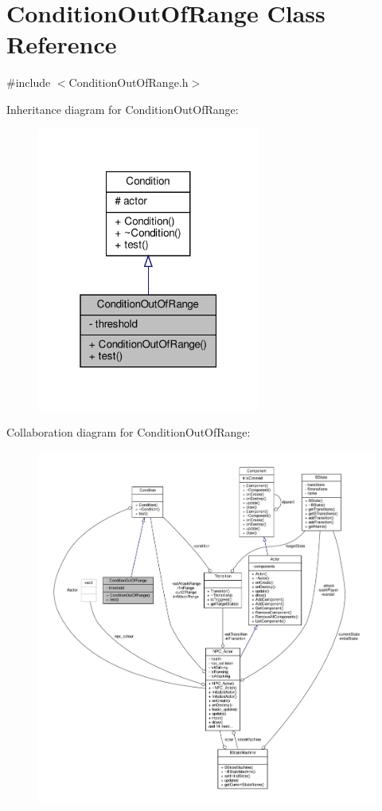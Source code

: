 \hypertarget{classConditionOutOfRange}{}\section{Condition\+Out\+Of\+Range Class Reference}
\label{classConditionOutOfRange}


{\ttfamily \#include $<$Condition\+Out\+Of\+Range.\+h$>$}



Inheritance diagram for Condition\+Out\+Of\+Range\+:
\nopagebreak
\begin{figure}[H]
\begin{center}
\leavevmode
\includegraphics[width=208pt]{classConditionOutOfRange__inherit__graph}
\end{center}
\end{figure}


Collaboration diagram for Condition\+Out\+Of\+Range\+:
\nopagebreak
\begin{figure}[H]
\begin{center}
\leavevmode
\includegraphics[width=350pt]{classConditionOutOfRange__coll__graph}
\end{center}
\end{figure}

